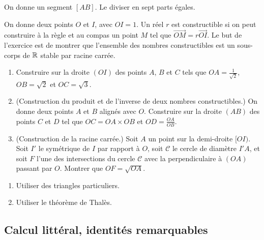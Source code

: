 \begin{exo}
On donne un segment $[AB]$. Le diviser en sept parts égales.
\end{exo} 




\begin{exo}
On donne deux points $O$ et $I$, avec $OI=1$. Un réel $r$ est constructible si on peut construire à la règle et au compas un point $M$ tel que $\overrightarrow{OM}=r\overrightarrow{OI}$. Le but de l'exercice est de montrer que l'ensemble des nombres constructibles est un sous-corps de $\mathbb R$ stable par racine carrée.
\begin{enumerate}
\item  Construire sur la droite $(OI)$ des points $A$, $B$ et  $C$  tels que $OA = \frac{1}{\sqrt{2}}$,  $OB =\sqrt{2}$ et $OC =\sqrt{3}$.
\item (Construction du produit et de l'inverse de deux nombres constructibles.) On donne deux points $A$ et $B$ alignés avec $O$. Construire sur la droite $(AB)$ des points $C$ et $D$ tel que $OC = OA\times OB$ et $OD = \frac{OA}{OB}$. 
\item (Construction de la racine carrée.) Soit $A$ un point sur la demi-droite $[OI)$. Soit $I'$ le symétrique de $I$ par rapport à $O$, soit $\mathcal C$ le cercle de diamètre $I'A$, et soit $F$ l'une des intersections du cercle $\mathcal C$ avec la perpendiculaire à $(OA)$ passant par $O$. Montrer que $OF = \sqrt{OA}$.
\end{enumerate}

\begin{hint}   
\begin{enumerate}
\item Utiliser des triangles particuliers.
\item Utiliser le théorème de Thalès.
\end{enumerate}
\end{hint}
     
      
\end{exo}  






 
\subsection{Calcul littéral, identités remarquables}



